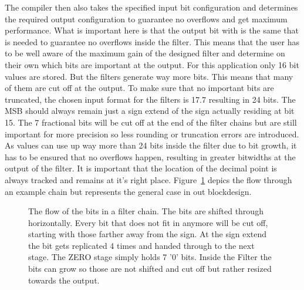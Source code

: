 The compiler then also takes the specified input bit configuration and determines the required output configuration to guarantee no overflows and get maximum performance.
What is important here is that the output bit with is the same that is needed to guarantee no overflows inside the filter. This means that the user has to be well aware of the maximum gain of the designed filter and determine on their own which bits are important at the output.
For this application only 16 bit values are stored. But the filters generate way more bits. This means that many of them are cut off at the output.
To make sure that no important bits are truncated, the chosen input format for the filters is 17.7 resulting in 24 bits. The MSB should always remain just a sign extend of the sign actually residing at bit 15. The 7 fractional bits will be cut off at the end of the filter chains but are still important for more precision so less rounding or truncation errors are introduced.
As values can use up way more than 24 bits inside the filter due to bit growth, it has to be ensured that no overflows happen, resulting in greater bitwidths at the output of the filter.
It is important that the location of the decimal point is always tracked and remains at it's right place.
Figure~\ref{fig:fpga:bitflow} depics the flow through an example chain but represents the general case in out blockdesign.

\begin{figure}
    \centering
    
    \caption{The flow of the bits in a filter chain. The bits are shifted through horizontally. Every bit that does not fit in anymore will be cut off, starting with those farther away from the sign. At the sign extend the bit gets replicated 4 times and handed through to the next stage. The ZERO stage simply holds 7 '0' bits. Inside the Filter the bits can grow so those are not shifted and cut off but rather resized towards the output.}
    \label{fig:fpga:bitflow}
\end{figure}

